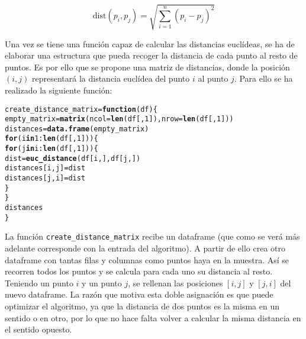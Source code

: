 \documentclass[12pt]{report}\usepackage[]{graphicx}\usepackage[dvipsnames]{xcolor}
\makeatletter
\newcommand{\hlnum}[1]{\textcolor[rgb]{0.686,0.059,0.569}{#1}}%
\newcommand{\hlopt}[1]{\textcolor[rgb]{0,0,0}{#1}}%
\newcommand{\hlstd}[1]{\textcolor[rgb]{0.345,0.345,0.345}{#1}}%
\newcommand{\hlkwa}[1]{\textcolor[rgb]{0.161,0.373,0.58}{\textbf{#1}}}%
\newcommand{\hlkwb}[1]{\textcolor[rgb]{0.69,0.353,0.396}{#1}}%
\newcommand{\hlkwc}[1]{\textcolor[rgb]{0.333,0.667,0.333}{#1}}%
\newcommand{\hlkwd}[1]{\textcolor[rgb]{0.737,0.353,0.396}{\textbf{#1}}}%
\newenvironment{kframe}{%
 \def\at@end@of@kframe{}%
 \ifinner\ifhmode%
  \def\at@end@of@kframe{\end{minipage}}%
  \begin{minipage}{\columnwidth}%
 \fi\fi%
 \def\FrameCommand##1{\hskip\@totalleftmargin \hskip-\fboxsep
 \colorbox{shadecolor}{##1}\hskip-\fboxsep
     \hskip-\linewidth \hskip-\@totalleftmargin \hskip\columnwidth}%
 \MakeFramed {\advance\hsize-\width
   \@totalleftmargin\z@ \linewidth\hsize
   \@setminipage}}%
 {\par\unskip\endMakeFramed%
 \at@end@of@kframe}
\newenvironment{knitrout}{}{} %
\newcommand{\dt}{\text{dist}}
\makeatother
\begin{document}
					$$
					\dt(p_i, p_j) = \sqrt{\sum_{i=1}^n (p_i-p_j)^2}
					$$
					
					Una vez se tiene una función capaz de calcular las distancias euclídeas, se ha de elaborar una estructura que pueda recoger la distancia de cada punto al resto de puntos. Es por ello que se propone una matriz de distancias, donde la posición $(i,j)$ representará la distancia euclídea del punto $i$ al punto $j$.
					Para ello se ha realizado la siguiente función:
					
\begin{knitrout}
\color{fgcolor}\begin{kframe}
\begin{alltt}
\hlstd{create_distance_matrix} \hlkwb{=} \hlkwa{function}\hlstd{(}\hlkwc{df}\hlstd{) \{}
        \hlstd{empty_matrix} \hlkwb{=} \hlkwd{matrix}\hlstd{(}\hlkwc{ncol} \hlstd{=} \hlkwd{len}\hlstd{(df[,}\hlnum{1}\hlstd{]),} \hlkwc{nrow} \hlstd{=} \hlkwd{len}\hlstd{(df[,}\hlnum{1}\hlstd{]))}
        \hlstd{distances} \hlkwb{=} \hlkwd{data.frame}\hlstd{(empty_matrix)}
        \hlkwa{for} \hlstd{(i} \hlkwa{in} \hlnum{1}\hlopt{:}\hlkwd{len}\hlstd{(df[,}\hlnum{1}\hlstd{])) \{}
                \hlkwa{for} \hlstd{(j} \hlkwa{in} \hlstd{i}\hlopt{:}\hlkwd{len}\hlstd{(df[,}\hlnum{1}\hlstd{])) \{}
                        \hlstd{dist} \hlkwb{=} \hlkwd{euc_distance}\hlstd{(df[i,], df[j,])}
                        \hlstd{distances[i,j]} \hlkwb{=} \hlstd{dist}
                        \hlstd{distances[j,i]} \hlkwb{=} \hlstd{dist}
                \hlstd{\}}
        \hlstd{\}}
        \hlstd{distances}
\hlstd{\}}
\end{alltt}
\end{kframe}
\end{knitrout}
					
					La función \texttt{create\_distance\_matrix} recibe un dataframe (que como se verá más adelante corresponde con la entrada del algoritmo). A partir de ello crea otro dataframe con tantas filas y columnas como puntos haya en la muestra. Así se recorren todos los puntos y se calcula para cada uno su distancia al resto. Teniendo un punto $i$ y un punto $j$, se rellenan las posiciones $[i,j]$ y $[j,i]$ del nuevo dataframe. La razón que motiva esta doble asignación es que puede optimizar el algoritmo, ya que la distancia de dos puntos es la misma en un sentido o en otro, por lo que no hace falta volver a calcular la misma distancia en el sentido opuesto.\\
					
\end{document}
